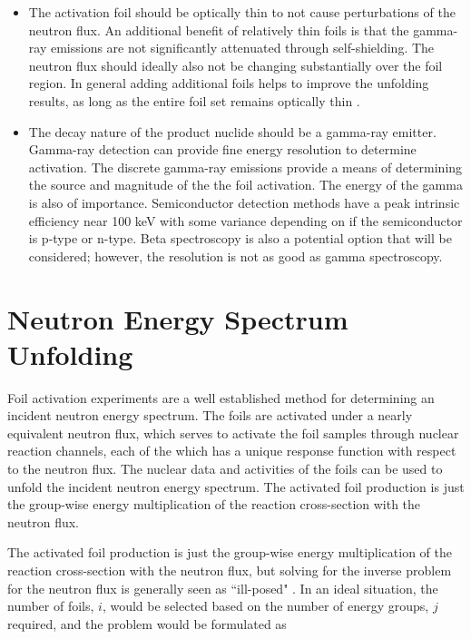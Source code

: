 \begin{itemize}
    \item The activation foil should be optically thin to not cause 
    perturbations of the neutron flux. An additional benefit of relatively thin 
    foils is that the gamma-ray emissions are not significantly attenuated 
    through self-shielding. The neutron flux should ideally also not be 
    changing substantially over the foil region. In general adding additional foils helps to improve the unfolding 
    results, as long as the entire foil set remains optically thin \cite{Vagena2018b}. 

    \item The decay nature of the product nuclide should be a gamma-ray 
    emitter. Gamma-ray detection can provide fine energy resolution to 
    determine activation. The discrete gamma-ray emissions provide a means of 
    determining the source and magnitude of the the foil activation. The energy 
    of the gamma is also of importance. Semiconductor detection methods have a 
    peak intrinsic efficiency near 100 keV with some variance depending on if 
    the semiconductor is p-type or n-type. Beta spectroscopy is also  a potential option that will be considered; however, the resolution is not as good as gamma spectroscopy.  
   
\end{itemize}


\section{Neutron Energy Spectrum Unfolding}

Foil activation experiments are a well established method for determining an 
incident neutron energy spectrum. The foils are activated under a nearly 
equivalent neutron flux, which serves to activate the foil samples through 
nuclear reaction channels, each of the which has a unique response 
function with respect to the neutron flux. The nuclear data and activities of 
the foils can be used to unfold the incident neutron energy spectrum.
The activated foil 
production is just the group-wise energy multiplication of the reaction 
cross-section with the neutron flux. 

The activated foil production is just the group-wise energy multiplication of the reaction cross-section with the neutron flux, but solving for the inverse problem for the neutron flux is generally seen as ``ill-posed" \cite{Vagena2018b}. 
In an ideal situation, the number of foils, $i$, would be selected based on the number of energy groups, $j$ required, and the problem would be formulated as \cite{Vagena2018b, Luciano2012a}  

